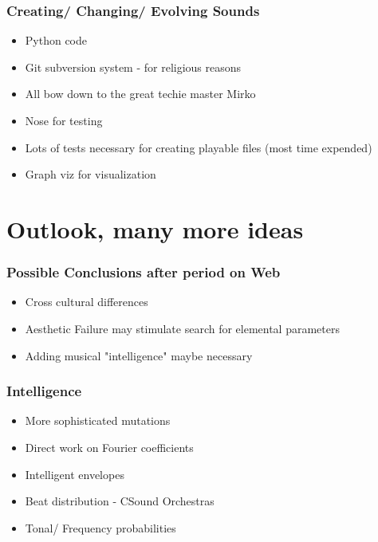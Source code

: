 \documentclass{beamer}
\begin{document}
\begin{frame}
	\frametitle{Creating/ Changing/ Evolving Sounds}
	\begin{itemize}
	\item<1-> Python code 
	\item<2-> Git subversion system - for religious reasons
	\item<3-> All bow down to the great techie master Mirko
	\item<4-> Nose for testing 
	\item<5-> Lots of tests necessary for creating playable files (most time expended)
	\item<6-> Graph viz for visualization
         \end{itemize}

\end{frame}


\label{sg:sec:imple}




\section{Outlook, many more ideas} %
\label{sg:sec:outlook_many_more_ideas}
\begin{frame}
	\frametitle{Possible Conclusions after period on Web}
	\begin{itemize}
	\item<1-> Cross cultural differences 
	\item<2-> Aesthetic Failure may stimulate search for elemental parameters
	\item<3-> Adding musical "intelligence" maybe necessary
	 \end{itemize}

\end{frame}
	
\begin{frame}
	\frametitle{Intelligence}
	\begin{itemize}
	\item<1-> More sophisticated mutations
	\item<2-> Direct work on Fourier coefficients
	\item<3-> Intelligent envelopes
	\item<4-> Beat distribution - CSound Orchestras
	\item<5-> Tonal/ Frequency probabilities
	  \end{itemize}

\end{frame}
	
\end{document}
